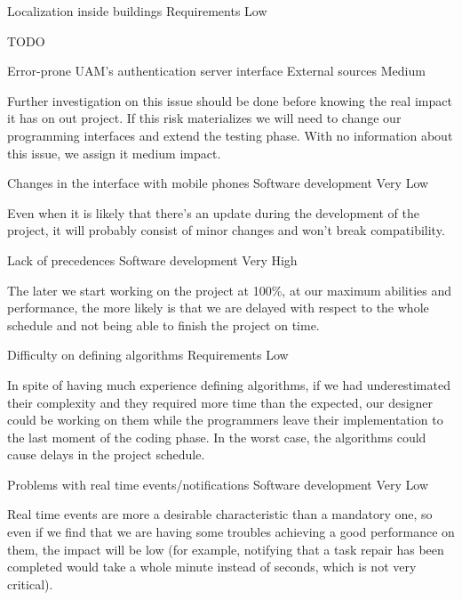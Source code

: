 \begin{risk}[riskLocalization]{Localization inside buildings}
\riskcat Requirements
 Low

TODO
\end{risk}

\begin{risk}[riskAuthServer]{Error-prone UAM's authentication server interface}
\riskcat External sources
 Medium

Further investigation on this issue should be done before knowing the real impact it has on out project. If this risk materializes we will need to change our programming interfaces and extend the testing phase. With no information about this issue, we assign it medium impact.
\end{risk}

\begin{risk}[riskPhone]{Changes in the interface with mobile phones}
\riskcat Software development
 Very Low

Even when it is likely that there's an update during the development of the project, it will probably consist of minor changes and won't break compatibility.
\end{risk}

\begin{risk}[riskPrec]{Lack of precedences}
\riskcat Software development
 Very High

The later we start working on the project at 100\%, at our maximum abilities and performance, the more likely is that we are delayed with respect to the whole schedule and not being able to finish the project on time.
\end{risk}

\begin{risk}[riskAlgorithms]{Difficulty on defining algorithms}
\riskcat Requirements
 Low

In spite of having much experience defining algorithms, if we had underestimated their complexity and they required more time than the expected, our designer could be working on them while the programmers leave their implementation to the last moment of the coding phase. In the worst case, the algorithms could cause delays in the project schedule.
\end{risk}

\begin{risk}[riskRealTime]{Problems with real time events/notifications}
\riskcat Software development
 Very Low

Real time events are more a desirable characteristic than a mandatory one, so even if we find that we are having some troubles achieving a good performance on them, the impact will be low (for example, notifying that a task repair has been completed would take a whole minute instead of seconds, which is not very critical).
\end{risk}

